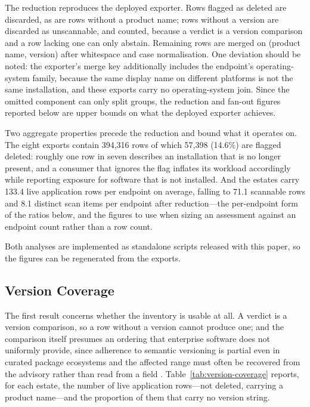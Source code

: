 \documentclass[fleqn,10pt,lineno]{wlpeerj}
\begin{document}
The reduction reproduces the deployed exporter. Rows flagged as deleted are discarded, as are rows without a product name; rows without a version are discarded as unscannable, and counted, because a verdict is a version comparison and a row lacking one can only abstain. Remaining rows are merged on (product name, version) after whitespace and case normalisation. One deviation should be noted: the exporter's merge key additionally includes the endpoint's operating-system family, because the same display name on different platforms is not the same installation, and these exports carry no operating-system join. Since the omitted component can only split groups, the reduction and fan-out figures reported below are upper bounds on what the deployed exporter achieves.

Two aggregate properties precede the reduction and bound what it operates on. The eight exports contain 394,316 rows of which 57,398 (14.6\%) are flagged deleted: roughly one row in seven describes an installation that is no longer present, and a consumer that ignores the flag inflates its workload accordingly while reporting exposure for software that is not installed. And the estates carry 133.4 live application rows per endpoint on average, falling to 71.1 scannable rows and 8.1 distinct scan items per endpoint after reduction---the per-endpoint form of the ratios below, and the figures to use when sizing an assessment against an endpoint count rather than a row count.

Both analyses are implemented as standalone scripts released with this paper, so the figures can be regenerated from the exports.

\subsection{Version Coverage}
\label{sec:version-coverage}
The first result concerns whether the inventory is usable at all. A verdict is a version comparison, so a row without a version cannot produce one; and the comparison itself presumes an ordering that enterprise software does not uniformly provide, since adherence to semantic versioning \cite{semver} is partial even in curated package ecosystems \cite{li2023golang,venturini2023} and the affected range must often be recovered from the advisory rather than read from a field \cite{bao2022}. Table~\ref{tab:version-coverage} reports, for each estate, the number of live application rows---not deleted, carrying a product name---and the proportion of them that carry no version string.
\end{document}
